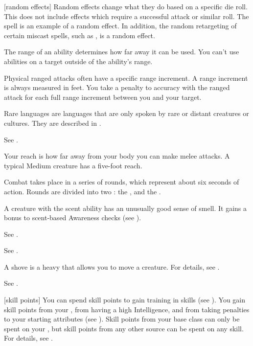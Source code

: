 [random effects] Random effects change what they do based on a specific die roll.
This does not include effects which require a successful attack or similar roll.
The  spell is an example of a random effect.
In addition, the random retargeting of certain miscast spells, such as , is a random effect.

 The range of an ability determines how far away it can be used.
You can't use abilities on a target outside of the ability's range.

 Physical ranged attacks often have a specific range increment.
A range increment is always measured in feet.
You take a  penalty to accuracy with the ranged attack for each full range increment between you and your target.

 Rare languages are languages that are only spoken by rare or distant creatures or cultures.
They are described in .

 See .

 Your reach is how far away from your body you can make melee attacks.
A typical Medium creature has a five-foot reach.

 Combat takes place in a series of rounds, which represent about six seconds of action.
Rounds are divided into two : the , and the .

 A creature with the scent ability has an unusually good sense of smell.
It gains a  bonus to scent-based Awareness checks (see ).

 See .

 See .

 A shove is a heavy  that allows you to move a creature.
For details, see .

 See .

[skill points] You can spend skill points to gain training in skills (see ).
You gain skill points from your , from having a high Intelligence, and from taking penalties to your starting attributes (see ).
Skill points from your base class can only be spent on your , but skill points from any other source can be spent on any skill.
For details, see .

